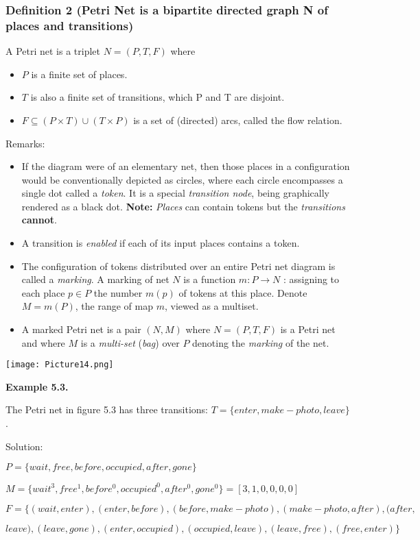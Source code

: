 \documentclass[a4paper]{article}
\begin{document}
\subsubsection{Definition 2 (Petri Net is a bipartite directed graph N of places and transitions)}
A Petri net is a triplet $N = (P, T, F)$ where
\begin{itemize}
    \item $P$ is a finite set of places.
    \item $T$ is also a finite set of transitions, which P and T are disjoint.
    \item $F \subseteq (P \times T) \cup (T \times P)$ is a set of (directed) arcs, called the flow relation.
\end{itemize}
Remarks:
\begin{itemize}
    \item If the diagram were of an elementary net, then those places in a configuration would be conventionally depicted as circles, where each circle encompasses a single dot called a \textit{token}. It is a special \textit{transition node}, being graphically rendered as a black dot. \textbf{Note:} \textit{Places} can contain tokens but the \textit{transitions} \textbf{cannot}.
    \item A transition is \textit{enabled} if each of its input places contains a token.
    \item The configuration of tokens distributed over an entire Petri net diagram is called a \textit{marking}. A marking of net $N$ is a function $m: P \rightarrow N$ : assigning to each place $p \in P$ the number $m(p)$ of tokens at this place.\newline
    Denote $M = m(P)$, the range of map $m$, viewed as a multiset.
    \item A marked Petri net is a pair $(N, M)$ where $N = (P ,T ,F)$ is a Petri net and where $M$ is a \textit{multi-set} (\textit{bag}) over $P$ denoting the \textit{marking} of the net.
\end{itemize}
\begin{center}
    \texttt{[image: Picture14.png]}
\end{center}

\textbf{Example 5.3.}\par
The Petri net in figure 5.3 has three transitions: $T = \{enter, make-photo, leave\}$.\par
Solution:\par
$P = \{wait , free , before , occupied , after , gone\}$\par
$M = \{wait^{3}, free^{1}, before^{0}, occupied^{0}, after^{0}, gone^{0}\} = [3, 1, 0, 0, 0, 0]$\par
$F = \{(wait, enter), (enter, before), (before, make-photo), (make-photo, after), (after,$\par $leave), (leave, gone), (enter, occupied), (occupied, leave), (leave, free), (free, enter)\}$
\par\null\par
\end{document}
